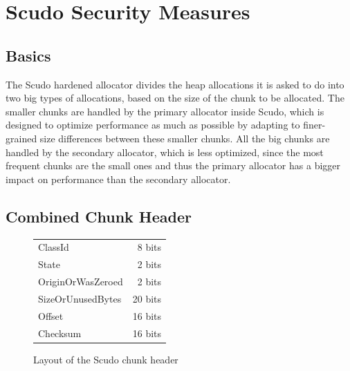 \documentclass[a4paper,11pt,oneside]{report}
\begin{document}
\chapter{Scudo Security Measures}

\section{Basics}

The Scudo hardened allocator divides the heap allocations it is asked to do into two big
types of allocations, based on the size of the chunk to be allocated.  The smaller chunks
are handled by the primary allocator inside Scudo, which is designed to optimize
performance as much as possible by adapting to finer-grained size differences between
these smaller chunks. All the big chunks are handled by the secondary allocator, which is
less optimized, since the most frequent chunks are the small ones and thus the primary
allocator has a bigger impact on performance than the secondary allocator.

\section{Combined Chunk Header}

\begin{figure}[h]
  \centering
  \begin{tabular}{l r}
    \toprule
    ClassId & 8 bits \\
    State & 2 bits \\
    OriginOrWasZeroed & 2 bits \\
    SizeOrUnusedBytes & 20 bits \\
    Offset & 16 bits \\
    Checksum & 16 bits \\
    \bottomrule
  \end{tabular}
  \caption{Layout of the Scudo chunk header}\label{fig:ScudoChunkHeader}
\end{figure}
\end{document}
